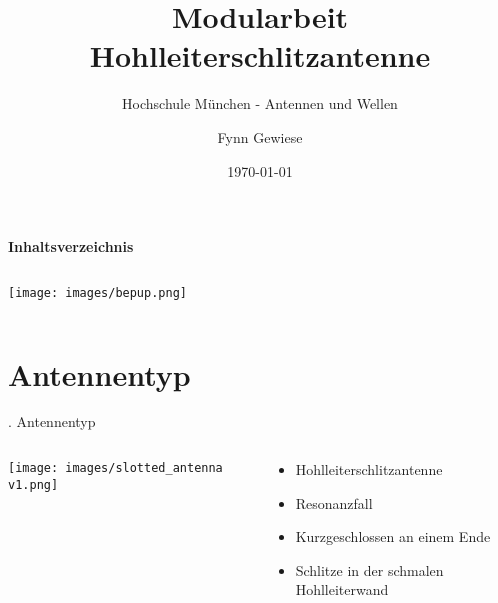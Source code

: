 \documentclass[
  aspectratio=169, %
]{beamer}
\title{Modularbeit Hohlleiterschlitzantenne}
\subtitle{Hochschule München - Antennen und Wellen}
\author{Fynn Gewiese}
\institute{Betreuer: Prof. Dr.-Ing. G. Strauß}
\date{\today}
\begin{document}
\maketitle

\begin{frame}[plain]{\Large \textbf{Inhaltsverzeichnis}}
\begin{columns}[T]
    \begin{column}{0.48\textwidth}
        \begin{minipage}[t]{\linewidth}
            \centering
            \texttt{[image: images/bepup.png]}
            \label{fig:marine_radar}
        \end{minipage}
    \end{column}
    
    \begin{column}{0.48\textwidth}
        \vspace{1cm}
        \tableofcontents
    \end{column}
\end{columns}
\end{frame}

\section{Antennentyp}
\begin{frame}{\thesection. Antennentyp}
\begin{columns}[T]

    \begin{column}{0.48\textwidth}
        \centering
        \texttt{[image: images/slotted\_antenna v1.png]}
        \label{fig:slotted_fusion}
    \end{column}

    \begin{column}{0.48\textwidth}
        \begin{itemize}
            \item Hohlleiterschlitzantenne
            \item Resonanzfall
            \item Kurzgeschlossen an einem Ende
            \item Schlitze in der schmalen Hohlleiterwand
        \end{itemize}
    \end{column}
\end{columns}
\end{frame}
\end{document}
